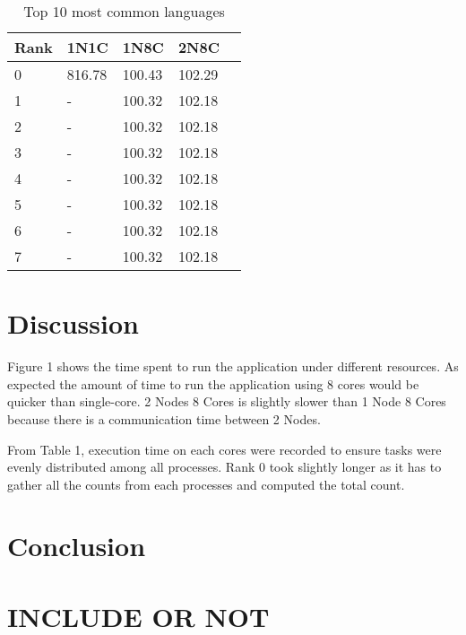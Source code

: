 \documentclass[11pt]{article}
\begin{document}
\begin{table}[h]
 \begin{center}
\begin{tabular}{|l|l|l|l|l|}

      \hline
      Rank &1N1C & 1N8C & 2N8C  \\
      \hline\hline
      0 & 816.78 & 100.43 & 102.29 \\
      1 & - & 100.32 & 102.18 \\
      2 & - & 100.32 & 102.18 \\
      3 & - & 100.32 & 102.18 \\
      4 & - & 100.32 & 102.18 \\
      5 & - & 100.32 & 102.18 \\
      6 & - & 100.32 & 102.18 \\
      7 & - & 100.32 & 102.18 \\

     \hline

\end{tabular}
\caption{Top 10 most common languages}\label{table2}
 \end{center}
\end{table}

\section{Discussion}

Figure 1 shows the time spent to run the application under different resources. As expected the amount of time to run the application using 8 cores would be quicker than single-core. 2 Nodes 8 Cores is slightly slower than 1 Node 8 Cores because there is a communication time between 2 Nodes. 

From Table 1, execution time on each cores were recorded to ensure tasks were evenly distributed among all processes. Rank 0 took slightly longer as it has to gather all the counts from each processes and computed the total count. 

 


\section{Conclusion}



\section{INCLUDE OR NOT}




\end{document}
